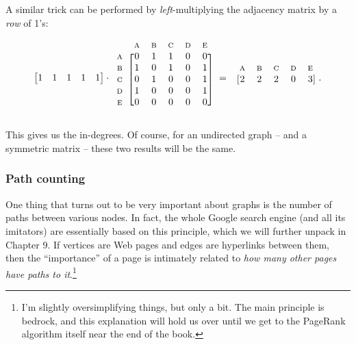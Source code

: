 A similar trick can be performed by \textit{left}-multiplying the adjacency
matrix by a \textit{row} of 1's:

\[
\begin{bmatrix}
1 & 1 & 1 & 1 & 1 \\
\end{bmatrix} \cdot
\begin{blockarray}{cccccc}
& {\scriptsize\textrm{A}} & {\scriptsize\textrm{B}} & {\scriptsize\textrm{C}} & {\scriptsize\textrm{D}} & {\scriptsize\textrm{E}} \\
\begin{block}{c[ccccc]}
{\scriptsize\textrm{A}} & 0 & 1 & 1 & 0 & 0 \\
{\scriptsize\textrm{B}} & 1 & 0 & 1 & 0 & 1 \\
{\scriptsize\textrm{C}} & 0 & 1 & 0 & 0 & 1 \\
{\scriptsize\textrm{D}} & 1 & 0 & 0 & 0 & 1 \\
{\scriptsize\textrm{E}} & 0 & 0 & 0 & 0 & 0 \\
\end{block}
\end{blockarray} \ =
\hspace*{-.1in}
\begin{blockarray}{cccccc}
& {\scriptsize\textrm{A}} & {\scriptsize\textrm{B}} & {\scriptsize\textrm{C}} & {\scriptsize\textrm{D}} & {\scriptsize\textrm{E}} \\
\begin{block}{c[ccccc]}
 & 2 & 2 & 2 & 0 & 3 \\
\end{block}
\end{blockarray}.
\]


This gives us the in-degrees. Of course, for an undirected graph -- and a
symmetric matrix -- these two results will be the same.


\subsubsection{Path counting}


One thing that turns out to be very important about graphs is the number of
paths between various nodes. In fact, the whole Google search engine (and all
its imitators) are essentially based on this principle, which we will further
unpack in Chapter 9. If vertices are Web pages and edges are hyperlinks between
them, then the ``importance'' of a page is intimately related to \textit{how
many other pages have paths to it}.\footnote{I'm slightly oversimplifying
things, but only a bit. The main principle is bedrock, and this explanation
will hold us over until we get to the PageRank algorithm itself near the end of
the book.}

